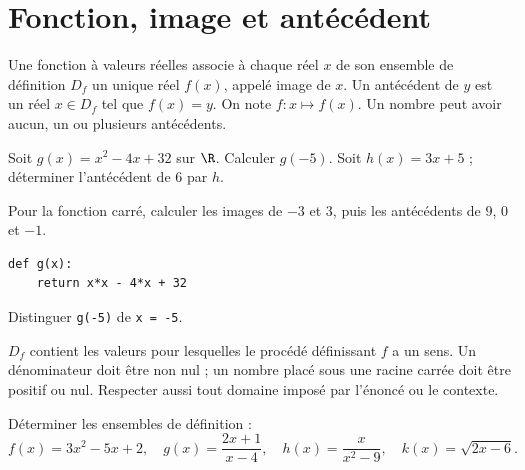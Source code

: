 \section{Fonction, image et antécédent}
\begin{keypoint}[Définition]
Une fonction à valeurs réelles associe à chaque réel $x$ de son ensemble de définition $D_f$ un unique réel $f(x)$, appelé image de $x$. Un antécédent de $y$ est un réel $x\in D_f$ tel que $f(x)=y$. On note $f:x\mapsto f(x)$. Un nombre peut avoir aucun, un ou plusieurs antécédents.
\end{keypoint}
\begin{example}Soit $g(x)=x^2-4x+32$ sur $\R$. Calculer $g(-5)$. Soit $h(x)=3x+5$ ; déterminer l'antécédent de $6$ par $h$.\end{example}
\begin{example}Pour la fonction carré, calculer les images de $-3$ et $3$, puis les antécédents de $9$, $0$ et $-1$.\end{example}
\begin{lstlisting}
def g(x):
    return x*x - 4*x + 32
\end{lstlisting}
\begin{example}Distinguer \texttt{g(-5)} de \texttt{x = -5}.\end{example}
\begin{keypoint}
$D_f$ contient les valeurs pour lesquelles le procédé définissant $f$ a un sens. Un dénominateur doit être non nul ; un nombre placé sous une racine carrée doit être positif ou nul. Respecter aussi tout domaine imposé par l'énoncé ou le contexte.
\end{keypoint}
\begin{example}Déterminer les ensembles de définition :
\[f(x)=3x^2-5x+2,\quad g(x)=\frac{2x+1}{x-4},\quad h(x)=\frac{x}{x^2-9},\quad k(x)=\sqrt{2x-6}.\]\end{example}

